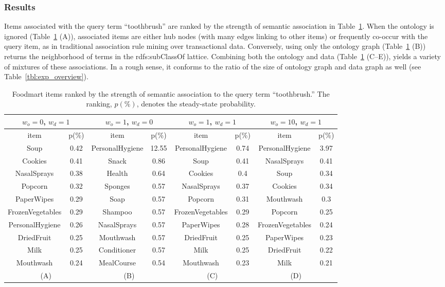 \subsubsection{Results}
Items associated with the query term ``toothbrush'' are ranked by the strength of semantic association in Table~\ref{tbl:foodmart_comp}.
When the ontology is ignored (Table~\ref{tbl:foodmart_comp} (A)), associated items are either hub nodes (with many edges linking to other items) or frequently co-occur with the query item, as in traditional association rule mining over transactional data. Conversely, using only the ontology graph (Table~\ref{tbl:foodmart_comp} (B)) returns the neighborhood of terms in the rdfs:subClassOf lattice. Combining both the ontology and data (Table~\ref{tbl:foodmart_comp} (C--E)),  yields a variety of mixtures of these associations. In a rough sense, it conforms to the ratio of the size of ontology graph and data graph as well (see Table~\ref{tbl:exp_overview}).
\begin{table}[tbh]\scriptsize
\begin{center}
\begin{tabular}{ c c || c c || c c || c c }
\hline
\multicolumn{2}{c||}{$w_o=0$, $w_d=1$}&\multicolumn{2}{c||}{$w_o=1$, $w_d=0$}&\multicolumn{2}{c||}{$w_o=1$, $w_d=1$}&\multicolumn{2}{c}{$w_o=10$, $w_d=1$}    \\
\hline
item	&	p(\%)	&	item	&	p(\%)	&	item	&	p(\%)	&	item	&	p(\%)	\\
\hline															
Soup	&	0.42	&	PersonalHygiene	&	12.55	&	PersonalHygiene	&	0.74	&	PersonalHygiene	&	3.97	\\
Cookies	&	0.41	&	Snack	&	0.86	&	Soup	&	0.41	&	NasalSprays	&	0.41	\\
NasalSprays	&	0.38	&	Health	&	0.64	&	Cookies	&	0.4	&	Soup	&	0.34	\\
Popcorn	&	0.32	&	Sponges	&	0.57	&	NasalSprays	&	0.37	&	Cookies	&	0.34	\\
PaperWipes	&	0.29	&	Soap	&	0.57	&	Popcorn	&	0.31	&	Mouthwash	&	0.3	\\
FrozenVegetables	&	0.29	&	Shampoo	&	0.57	&	FrozenVegetables	&	0.29	&	Popcorn	&	0.25	 \\
PersonalHygiene	&	0.26	&	NasalSprays	&	0.57	&	PaperWipes	&	0.28	&	FrozenVegetables	&	0.24	 \\
DriedFruit	&	0.25	&	Mouthwash	&	0.57	&	DriedFruit	&	0.25	&	PaperWipes	&	0.23	 \\
Milk	&	0.25	&	Conditioner	&	0.57	&	Milk	&	0.25	&	DriedFruit	&	0.22	\\
Mouthwash	&	0.24	&	MealCourse	&	0.54	&	Mouthwash	&	0.23	&	Milk	&	0.21	\\
\hline
\multicolumn{2}{c}{(A)}  &   \multicolumn{2}{c}{(B)}  &   \multicolumn{2}{c}{(C)}  &   \multicolumn{2}{c}{(D)}  \\
\end{tabular}
\end{center}
\caption{\label{tbl:foodmart_comp} Foodmart items ranked by the strength of semantic association to the query term ``toothbrush.'' The ranking, $p(\%)$, denotes the steady-state probability.}
\end{table}

